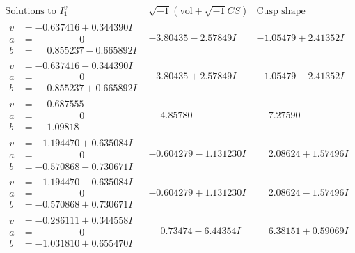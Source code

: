 \documentclass[1p]{elsarticle_modified}
\theoremstyle{definition}
\newcommand{\I}{\sqrt{-1}}
\begin{document}
$$\begin{array}{c|c|c}  
\text{Solutions to }I^v_{1}& \I (\text{vol} + \sqrt{-1}CS) & \text{Cusp shape}\\
 \hline 
\begin{aligned}
v &= -0.637416 + 0.344390 I \\
a &= \phantom{-0.000000 } 0 \\
b &= \phantom{-}0.855237 - 0.665892 I\end{aligned}
 & -3.80435 - 2.57849 I & -1.05479 + 2.41352 I \\ \hline\begin{aligned}
v &= -0.637416 - 0.344390 I \\
a &= \phantom{-0.000000 } 0 \\
b &= \phantom{-}0.855237 + 0.665892 I\end{aligned}
 & -3.80435 + 2.57849 I & -1.05479 - 2.41352 I \\ \hline\begin{aligned}
v &= \phantom{-}0.687555\phantom{ +0.000000I} \\
a &= \phantom{-0.000000 } 0 \\
b &= \phantom{-}1.09818\phantom{ +0.000000I}\end{aligned}
 & \phantom{-}4.85780\phantom{ +0.000000I} & \phantom{-}7.27590\phantom{ +0.000000I} \\ \hline\begin{aligned}
v &= -1.194470 + 0.635084 I \\
a &= \phantom{-0.000000 } 0 \\
b &= -0.570868 - 0.730671 I\end{aligned}
 & -0.604279 - 1.131230 I & \phantom{-}2.08624 + 1.57496 I \\ \hline\begin{aligned}
v &= -1.194470 - 0.635084 I \\
a &= \phantom{-0.000000 } 0 \\
b &= -0.570868 + 0.730671 I\end{aligned}
 & -0.604279 + 1.131230 I & \phantom{-}2.08624 - 1.57496 I \\ \hline\begin{aligned}
v &= -0.286111 + 0.344558 I \\
a &= \phantom{-0.000000 } 0 \\
b &= -1.031810 + 0.655470 I\end{aligned}
 & \phantom{-}0.73474 - 6.44354 I & \phantom{-}6.38151 + 0.59069 I \\ \hline\begin{aligned}

\end{aligned}
\end{array}$$
\end{document}
